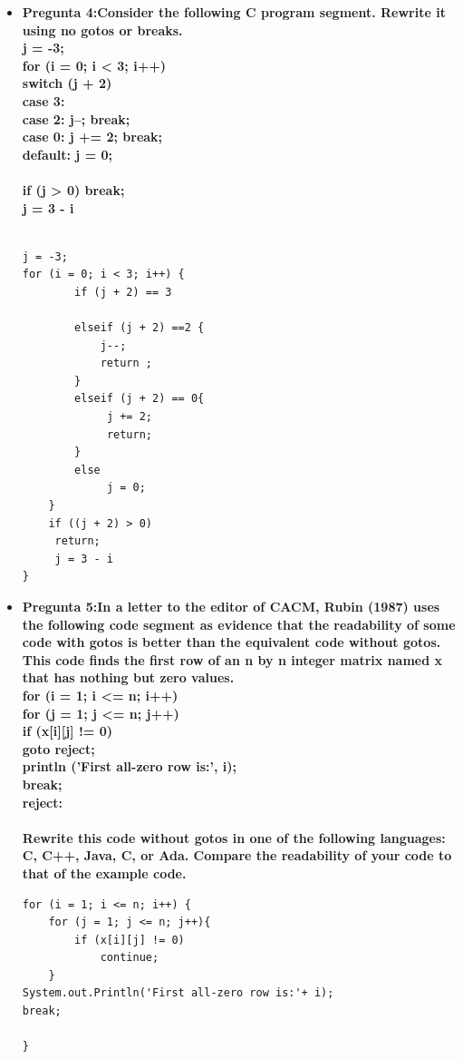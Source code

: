 \documentclass[12pt,oneside]{article}
\begin{document}
\begin{itemize}
	
					
				\item {\bf Pregunta 4:Consider the following C program segment. Rewrite it using no gotos or breaks.\\
j = -3;\\
for (i = 0; i < 3; i++) {\\
	switch (j + 2) {\\
		case 3:\\
		case 2: j--; break;\\
		case 0: j += 2; break;\\
		default: j = 0;\\
	}\\
	if (j > 0) break;\\
	     j = 3 - i\\
}\\
}
\begin{lstlisting}[frame=single]
j = -3;
for (i = 0; i < 3; i++) {
		if (j + 2) == 3 

		elseif (j + 2) ==2 {
			j--;
			return ;
		}
		elseif (j + 2) == 0{
			 j += 2;
			 return;
		}
		else 
			 j = 0;
	}
	if ((j + 2) > 0)
	 return;
	 j = 3 - i
}

\end{lstlisting}



				\item {\bf Pregunta 5:In a letter to the editor of CACM, Rubin (1987) uses the following code
segment as evidence that the readability of some code with gotos is better
than the equivalent code without gotos. This code finds the first row
of an n by n integer matrix named x that has nothing but zero values.\\
for (i = 1; i <= n; i++) {\\
for (j = 1; j <= n; j++)\\
if (x[i][j] != 0)\\
goto reject;\\
println ('First all-zero row is:', i);\\
break;\\
reject:\\
}\\

Rewrite this code without gotos in one of the following languages: C,
C++, Java, C, or Ada. Compare the readability of your code to that of
the example code.}

\begin{lstlisting}[frame=single]
for (i = 1; i <= n; i++) {
	for (j = 1; j <= n; j++){
		if (x[i][j] != 0)
			continue;
	}
System.out.Println('First all-zero row is:'+ i);
break;

}
\end{lstlisting}

					
			\end{itemize}
\end{document}
